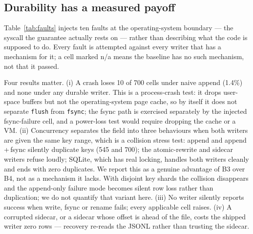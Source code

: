 \subsection{Durability has a measured payoff}

Table~\ref{tab:faults} injects ten faults at the operating-system boundary ---
the syscall the guarantee actually rests on --- rather than describing what the
code is supposed to do. Every fault is attempted against every writer that has a
mechanism for it; a cell marked n/a means the baseline has no such mechanism, not
that it passed.

Four results matter. (i) A crash loses 10 of 700 cells under naive append (1.4\%)
and none under any durable writer. This is a process-crash test: it drops
user-space buffers but not the operating-system page cache, so by itself it does
not separate \texttt{flush} from \texttt{fsync}; the fsync path is exercised
separately by the injected fsync-failure cell, and a power-loss test would
require dropping the cache or a VM. (ii) Concurrency separates the field into
three behaviours when both writers are given the same key range, which is a
collision stress test: append and append\,+\,fsync silently duplicate keys (545
and 700); the atomic-rewrite and sidecar writers refuse loudly; SQLite, which has
real locking, handles both writers cleanly and ends with zero duplicates. We
report this as a genuine advantage of B3 over B4, not as a mechanism it lacks.
With disjoint key shards the collision disappears and the append-only failure
mode becomes silent row loss rather than duplication; we do not quantify that
variant here. (iii) No writer silently reports success when write, fsync or rename
fails; every applicable cell raises. (iv) A corrupted sidecar, or a sidecar
whose offset is ahead of the file, costs the shipped writer zero rows --- recovery
re-reads the JSONL rather than trusting the sidecar.

